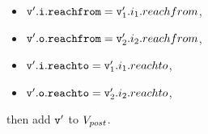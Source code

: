 \begin{itemize}
\begin{enumerate}
\begin{itemize}
\item $\mathtt{v}'.\mathtt{i}.\mathtt{reachfrom} = \mathtt{v}_1'.i_1.reachfrom$,
\item $\mathtt{v}'.\mathtt{o}.\mathtt{reachfrom} = \mathtt{v}_2'.i_2.reachfrom$,
\item $\mathtt{v}'.\mathtt{i}.\mathtt{reachto} = \mathtt{v}_1'.i_1.reachto$,
\item $\mathtt{v}'.\mathtt{o}.\mathtt{reachto} = \mathtt{v}_2'.i_2.reachto$,
\end{itemize} then add $\tt v'$ to $V_{post}$. 
\end{enumerate}
%

\end{itemize}
